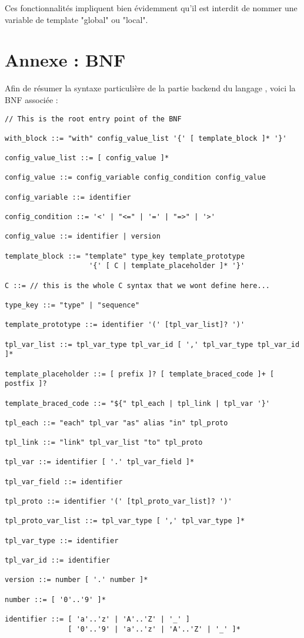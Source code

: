 \documentclass[french]{rtxreport}
\begin{document}
Ces fonctionnalités impliquent bien évidemment qu'il est interdit de nommer une
variable de template "global" ou "local".


\chapter{Annexe : BNF}

Afin de résumer la syntaxe particulière de la partie backend du langage \rtx,
voici la BNF associée :

\lstset{}
\begin{lstlisting}
// This is the root entry point of the BNF

with_block ::= "with" config_value_list '{' [ template_block ]* '}'

config_value_list ::= [ config_value ]*

config_value ::= config_variable config_condition config_value

config_variable ::= identifier

config_condition ::= '<' | "<=" | '=' | "=>" | '>'

config_value ::= identifier | version

template_block ::= "template" type_key template_prototype
                    '{' [ C | template_placeholder ]* '}'

C ::= // this is the whole C syntax that we wont define here...

type_key ::= "type" | "sequence"

template_prototype ::= identifier '(' [tpl_var_list]? ')'

tpl_var_list ::= tpl_var_type tpl_var_id [ ',' tpl_var_type tpl_var_id ]*

template_placeholder ::= [ prefix ]? [ template_braced_code ]+ [ postfix ]?

template_braced_code ::= "${" tpl_each | tpl_link | tpl_var '}'

tpl_each ::= "each" tpl_var "as" alias "in" tpl_proto

tpl_link ::= "link" tpl_var_list "to" tpl_proto

tpl_var ::= identifier [ '.' tpl_var_field ]*

tpl_var_field ::= identifier

tpl_proto ::= identifier '(' [tpl_proto_var_list]? ')'

tpl_proto_var_list ::= tpl_var_type [ ',' tpl_var_type ]*

tpl_var_type ::= identifier

tpl_var_id ::= identifier

version ::= number [ '.' number ]*

number ::= [ '0'..'9' ]*

identifier ::= [ 'a'..'z' | 'A'..'Z' | '_' ]
               [ '0'..'9' | 'a'..'z' | 'A'..'Z' | '_' ]*

\end{lstlisting}
\end{document}
